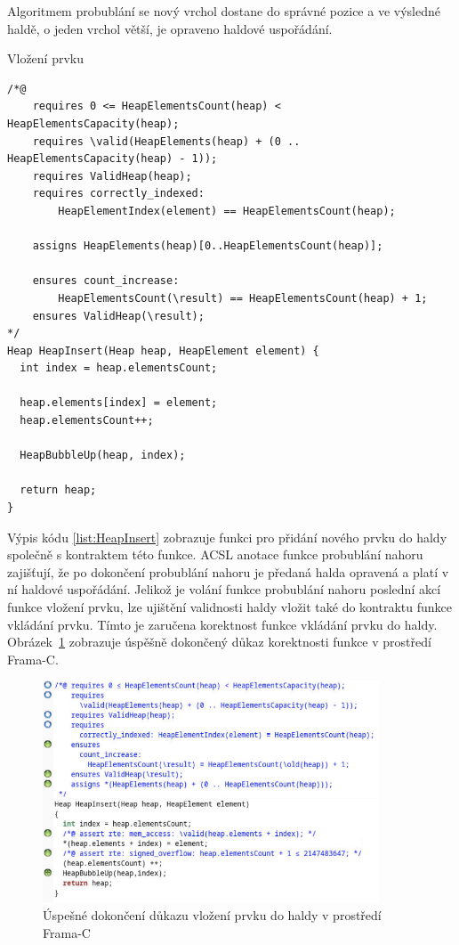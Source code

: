 Algoritmem probublání se nový vrchol dostane do správné pozice a ve výsledné haldě, o jeden vrchol větší, je opraveno haldové uspořádání.

\begin{listing}[H]
	\caption{Vložení prvku}
	\label{list:HeapInsert}
	\begin{verbatim}
/*@
    requires 0 <= HeapElementsCount(heap) < HeapElementsCapacity(heap);
    requires \valid(HeapElements(heap) + (0 .. HeapElementsCapacity(heap) - 1));
    requires ValidHeap(heap);
    requires correctly_indexed:
    	HeapElementIndex(element) == HeapElementsCount(heap);

    assigns HeapElements(heap)[0..HeapElementsCount(heap)];
    
    ensures count_increase: 
    	HeapElementsCount(\result) == HeapElementsCount(heap) + 1;
    ensures ValidHeap(\result);
*/
Heap HeapInsert(Heap heap, HeapElement element) {
  int index = heap.elementsCount;

  heap.elements[index] = element;
  heap.elementsCount++;

  HeapBubbleUp(heap, index);

  return heap;
}
	\end{verbatim}
\end{listing}

Výpis kódu \ref{list:HeapInsert} zobrazuje funkci pro přidání nového prvku do haldy společně s kontraktem této funkce. ACSL anotace funkce probublání nahoru zajišťují, že po dokončení probublání nahoru je předaná halda opravená a platí v ní haldové uspořádání. Jelikož je volání funkce probublání nahoru poslední akcí funkce vložení prvku, lze ujištění validnosti haldy vložit také do kontraktu funkce vkládání prvku. Tímto je zaručena korektnost funkce vkládání prvku do haldy. Obrázek~\ref{img:F-C-HeapInsert} zobrazuje úspěšně dokončený důkaz korektnosti funkce v prostředí Frama-C.

\begin{figure}[H]
	\centering
	\includegraphics[width=10cm]{images/frama-c-HeapInsert}
	\caption{Úspešné dokončení důkazu vložení prvku do haldy v prostředí Frama-C}
	\label{img:F-C-HeapInsert}
\end{figure}


